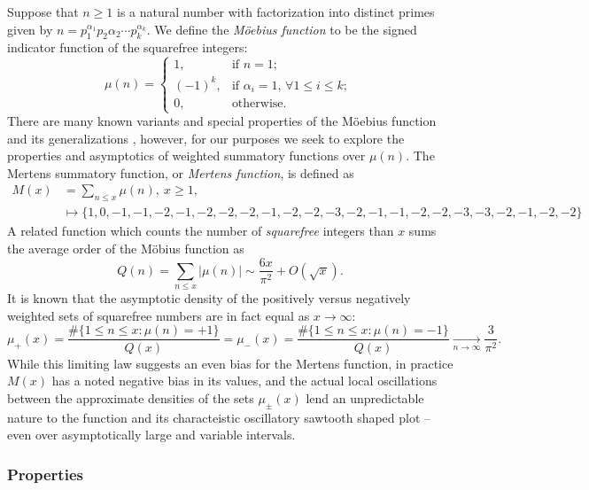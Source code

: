 \documentclass[11pt,reqno,a4letter]{article}
\numberwithin{figure}{section}
\numberwithin{table}{section}
\newcommand{\cf}{\textit{cf.\ }}
\newcommand{\seqnum}[1]{\href{http://oeis.org/#1}{\color{ProcessBlue}{\underline{#1}}}}
\theoremstyle{plain}
\numberwithin{theorem}{section}
\theoremstyle{definition}
\begin{document}
Suppose that $n \geq 1$ is a natural number with factorization into 
distinct primes given by 
$n = p_1^{\alpha_1} p_2{\alpha_2} \cdots p_k^{\alpha_k}$. 
We define the \emph{M\"oebius function} to be the signed indicator function 
of the squarefree integers: 
\[
\mu(n) = \begin{cases} 
     1, & \text{if $n = 1$; } \\ 
     (-1)^k, & \text{if $\alpha_i = 1$, $\forall 1 \leq i \leq k$; } \\ 
     0, & \text{otherwise.} 
     \end{cases} 
\]
There are many known variants and special properties of the M\"oebius function 
and its generalizations \cite[\cf \S 2]{HANDBOOKNT-2004}, however, for our 
purposes we seek to explore the properties and asymptotics of weighted 
summatory functions over $\mu(n)$. 
The Mertens summatory function, or \emph{Mertens function}, is defined as 
\cite[\seqnum{A002321}]{OEIS} 
\begin{align*} 
M(x) & = \sum_{n \leq x} \mu(n),\ x \geq 1, \\ 
     & \longmapsto \{1, 0, -1, -1, -2, -1, -2, -2, -2, -1, -2, -2, -3, -2, 
     -1, -1, -2, -2, -3, -3, -2, -1, -2, -2\}
\end{align*} 
A related function which counts the 
number of \emph{squarefree} integers than $x$ sums the average order of the M\"obius function as 
\cite[\seqnum{A013928}]{OEIS} 
\[ 
Q(n) = \sum_{n \leq x} |\mu(n)| \sim \frac{6x}{\pi^2} + O\left(\sqrt{x}\right). 
\] 
It is known that the asymptotic density of the positively versus negatively 
weighted sets of squarefree numbers are in fact equal as $x \rightarrow \infty$: 
\[
\mu_{+}(x) = \frac{\#\{1 \leq n \leq x: \mu(n) = +1\}}{Q(x)} = 
     \mu_{-}(x) = \frac{\#\{1 \leq n \leq x: \mu(n) = -1\}}{Q(x)} 
     \xrightarrow[n \rightarrow \infty]{} \frac{3}{\pi^2}. 
\]
While this limiting law suggests an even bias for the Mertens function, 
in practice $M(x)$ has a noted negative bias in its values, and the actual 
local oscillations between the approximate densities of the sets 
$\mu_{\pm}(x)$ lend an unpredictable nature to the function and its 
characteistic oscillatory sawtooth shaped plot -- even over asymptotically 
large and variable intervals.

\subsubsection{Properties} 
\end{document}
